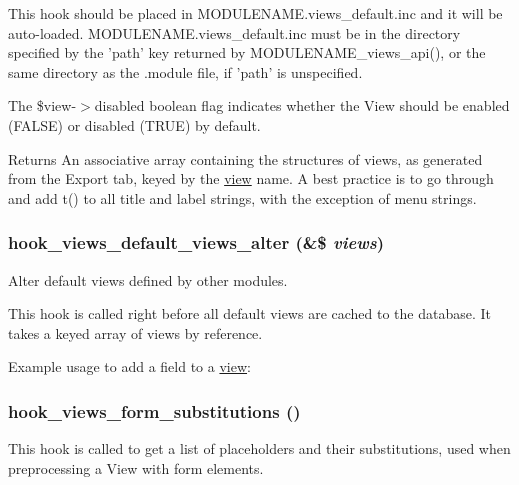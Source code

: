 This hook should be placed in MODULENAME.views\_\-default.inc and it will be auto-\/loaded. MODULENAME.views\_\-default.inc must be in the directory specified by the 'path' key returned by MODULENAME\_\-views\_\-api(), or the same directory as the .module file, if 'path' is unspecified.

The \$view-\/$>$disabled boolean flag indicates whether the View should be enabled (FALSE) or disabled (TRUE) by default.

\begin{DoxyReturn}{Returns}
An associative array containing the structures of views, as generated from the Export tab, keyed by the \hyperlink{classview}{view} name. A best practice is to go through and add t() to all title and label strings, with the exception of menu strings. 
\end{DoxyReturn}
\hypertarget{group__views__hooks_gacd31035a6ae9c7baf05ad034d6a65768}{
\subsubsection[{hook\_\-views\_\-default\_\-views\_\-alter}]{\setlength{\rightskip}{0pt plus 5cm}hook\_\-views\_\-default\_\-views\_\-alter (\&\$ {\em views})}}
\label{group__views__hooks_gacd31035a6ae9c7baf05ad034d6a65768}
Alter default views defined by other modules.

This hook is called right before all default views are cached to the database. It takes a keyed array of views by reference.

Example usage to add a field to a \hyperlink{classview}{view}: 
 \hypertarget{group__views__hooks_gaf51ae4253a5a2215dbf8dc56d8be7e60}{
\subsubsection[{hook\_\-views\_\-form\_\-substitutions}]{\setlength{\rightskip}{0pt plus 5cm}hook\_\-views\_\-form\_\-substitutions ()}}
\label{group__views__hooks_gaf51ae4253a5a2215dbf8dc56d8be7e60}
This hook is called to get a list of placeholders and their substitutions, used when preprocessing a View with form elements.

